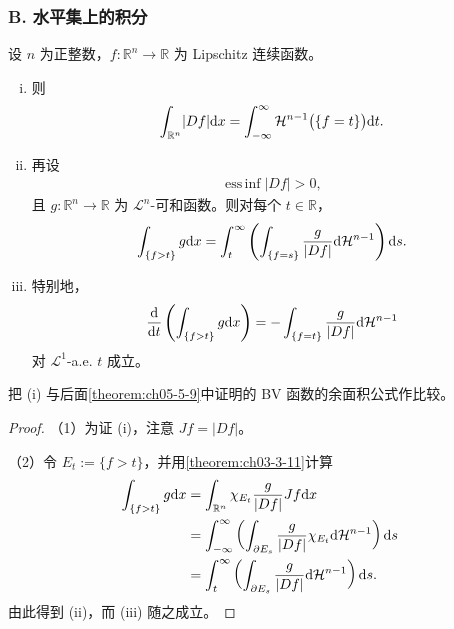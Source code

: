 \documentclass[../../main.tex]{subfiles}%
\begin{document}
\subsubsection*{B. 水平集上的积分}

\begin{theorem}[水平集上的积分]\label{theorem:ch03-3-13}
设 $n$ 为正整数，$f:\mathbb{R}^n\to\mathbb{R}$ 为 Lipschitz 连续函数。
\begin{enumerate}[(i)]
\item 则
\begin{align*}
\int_{\mathbb{R}^n}\lvert Df\rvert\mathrm{d} x=\int_{-\infty}^{\infty}\mathcal{H}^{n-1}\bigl(\{f=t\}\bigr)\mathrm{d} t.
\end{align*}
\item 再设
\begin{align*}
\operatorname*{ess\,inf}\lvert Df\rvert>0,
\end{align*}
且 $g:\mathbb{R}^n\to\mathbb{R}$ 为 $\mathcal{L}^n$-可和函数。则对每个 $t\in\mathbb{R}$，
\begin{align*}
\int_{\{f>t\}}g\mathrm{d} x=\int_t^{\infty}\left(\int_{\{f=s\}}\frac{g}{\lvert Df\rvert}\mathrm{d}\mathcal{H}^{n-1}\right)\mathrm{d} s.
\end{align*}
\item 特别地，
\begin{align*}
\frac{\mathrm{d}}{\mathrm{d} t}\left(\int_{\{f>t\}}g\mathrm{d} x\right)=-\int_{\{f=t\}}\frac{g}{\lvert Df\rvert}\mathrm{d}\mathcal{H}^{n-1}
\end{align*}
对 $\mathcal{L}^1$-a.e. $t$ 成立。
\end{enumerate}
\end{theorem}

\begin{remark}\label{remark:ch03-thm-3-13-比较}
把 (i) 与后面\cref{theorem:ch05-5-9}中证明的 BV 函数的余面积公式作比较。%
\end{remark}

\begin{proof}
（1）为证 (i)，注意 $Jf=\lvert Df\rvert$。

（2）令 $E_t:=\{f>t\}$，并用\cref{theorem:ch03-3-11}计算%
\begin{align*}
\int_{\{f>t\}}g\mathrm{d} x&=\int_{\mathbb{R}^n}\chi_{E_t}\frac{g}{\lvert Df\rvert}Jf\mathrm{d} x\\
&=\int_{-\infty}^{\infty}\left(\int_{\partial E_s}\frac{g}{\lvert Df\rvert}\chi_{E_t}\mathrm{d}\mathcal{H}^{n-1}\right)\mathrm{d} s\\
&=\int_t^{\infty}\left(\int_{\partial E_s}\frac{g}{\lvert Df\rvert}\mathrm{d}\mathcal{H}^{n-1}\right)\mathrm{d} s.
\end{align*}
由此得到 (ii)，而 (iii) 随之成立。
\end{proof}
\end{document}
